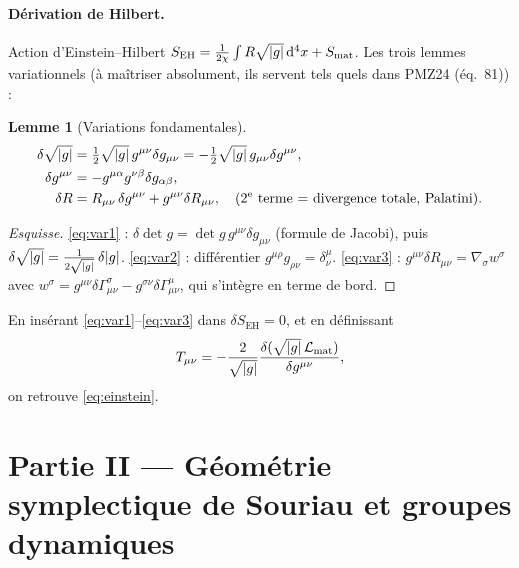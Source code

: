 \documentclass[11pt,a4paper]{article}
\theoremstyle{definition}
\newtheorem{lemme}{Lemme}[section]
\theoremstyle{plain}
\newcommand{\dx}{\,\dd^4x}
\newcommand{\half}{\tfrac{1}{2}}
\newcommand{\eqpaper}[1]{\textsf{(éq.~#1)}}   %
\begin{document}
\paragraph{Dérivation de Hilbert.} Action d'Einstein–Hilbert
$S_{\mathrm{EH}}=\frac{1}{2\chi}\int R\sqrt{\abs{g}}\dx + S_{\text{mat}}$.
Les trois lemmes variationnels (à maîtriser absolument, ils servent tels quels dans PMZ24
\eqpaper{81}) :

\begin{lemme}[Variations fondamentales]\label{lem:var}
\begin{align}
\delta\sqrt{\abs{g}} &= \half\sqrt{\abs{g}}\,g^{\mu\nu}\delta g_{\mu\nu}
                     = -\half\sqrt{\abs{g}}\,g_{\mu\nu}\delta g^{\mu\nu}, \label{eq:var1}\\
\delta g^{\mu\nu} &= -g^{\mu\alpha}g^{\nu\beta}\delta g_{\alpha\beta}, \label{eq:var2}\\
\delta R &= R_{\mu\nu}\,\delta g^{\mu\nu}+g^{\mu\nu}\delta R_{\mu\nu},
\quad\text{(2$^{\text e}$ terme = divergence totale, Palatini).} \label{eq:var3}
\end{align}
\end{lemme}

\begin{proof}[Esquisse]
\eqref{eq:var1} : $\delta\det g=\det g\,g^{\mu\nu}\delta g_{\mu\nu}$ (formule de Jacobi),
puis $\delta\sqrt{\abs{g}}=\tfrac{1}{2\sqrt{\abs{g}}}\,\delta\abs{g}$.
\eqref{eq:var2} : différentier $g^{\mu\rho}g_{\rho\nu}=\delta^\mu_\nu$.
\eqref{eq:var3} : $g^{\mu\nu}\delta R_{\mu\nu}=\nabla_\sigma w^\sigma$ avec
$w^\sigma=g^{\mu\nu}\delta\Gamma^\sigma_{\mu\nu}-g^{\sigma\nu}\delta\Gamma^\mu_{\mu\nu}$,
qui s'intègre en terme de bord.
\end{proof}

En insérant \eqref{eq:var1}--\eqref{eq:var3} dans $\delta S_{\mathrm{EH}}=0$, et en définissant
\begin{equation}
T_{\mu\nu}=-\frac{2}{\sqrt{\abs{g}}}\frac{\delta(\sqrt{\abs{g}}\,\mathcal L_{\text{mat}})}{\delta g^{\mu\nu}},
\label{eq:Tdef}
\end{equation}
on retrouve \eqref{eq:einstein}.

\section{Partie II — Géométrie symplectique de Souriau et groupes dynamiques}
\label{part:souriau}
\end{document}
